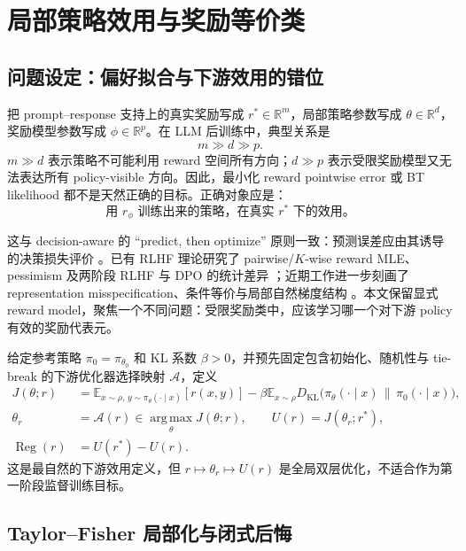 \documentclass[UTF8,11pt,a4paper,fontset=none]{ctexart}
\newcommand{\R}{\mathbb{R}}
\newcommand{\E}{\mathbb{E}}
\newcommand{\KL}{D_{\mathrm{KL}}}
\newcommand{\Reg}{\operatorname{Reg}}
\newcommand{\argmax}{\operatorname*{arg\,max}}
\begin{document}
\section{局部策略效用与奖励等价类}

\subsection{问题设定：偏好拟合与下游效用的错位}

把 prompt--response 支持上的真实奖励写成 $r^*\in\R^m$，局部策略参数写成 $\theta\in\R^d$，奖励模型参数写成 $\phi\in\R^p$。在 LLM 后训练中，典型关系是
\[
\boxed{m\gg d\gg p.}
\]
$m\gg d$ 表示策略不可能利用 reward 空间所有方向；$d\gg p$ 表示受限奖励模型又无法表达所有 policy-visible 方向。因此，最小化 reward pointwise error 或 BT likelihood 都不是天然正确的目标。正确对象应是：
\[
\text{用 }r_\phi\text{ 训练出来的策略，在真实 }r^*\text{ 下的效用。}
\]

这与 decision-aware 的 ``predict, then optimize'' 原则一致：预测误差应由其诱导的决策损失评价 \cite{spo}。已有 RLHF 理论研究了 pairwise/$K$-wise reward MLE、pessimism 及两阶段 RLHF 与 DPO 的统计差异 \cite{zhu_principled,nika_rml_dpo,li_rl_dpo}；近期工作进一步刻画了 representation misspecification、条件等价与局部自然梯度结构 \cite{shi_gap,yang_equivalence,gopalan_misspecified}。本文保留显式 reward model，聚焦一个不同问题：受限奖励类中，应该学习哪一个对下游 policy 有效的奖励代表元。

给定参考策略 $\pi_0=\pi_{\theta_0}$ 和 KL 系数 $\beta>0$，并预先固定包含初始化、随机性与 tie-break 的下游优化器选择映射 $\mathcal A$，定义
\begin{align}
J(\theta;r)&=\E_{x\sim\rho,\,y\sim\pi_\theta(\cdot\mid x)}[r(x,y)]
-\beta\E_{x\sim\rho}\KL\bigl(\pi_\theta(\cdot\mid x)\,\|\,\pi_0(\cdot\mid x)\bigr),\\
\theta_r&=\mathcal A(r)\in\argmax_\theta J(\theta;r),\qquad U(r)=J(\theta_r;r^*),\\
\Reg(r)&=U(r^*)-U(r).
\end{align}
这是最自然的下游效用定义，但 $r\mapsto\theta_r\mapsto U(r)$ 是全局双层优化，不适合作为第一阶段监督训练目标。

\subsection{Taylor--Fisher 局部化与闭式后悔}
\end{document}
